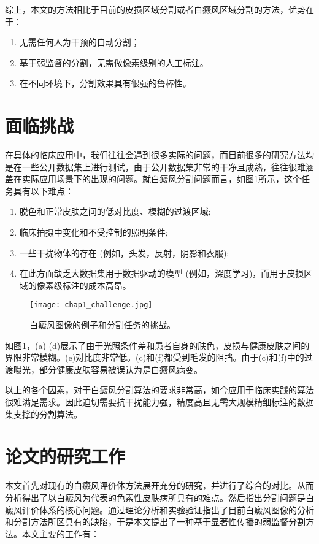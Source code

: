 综上，本文的方法相比于目前的皮损区域分割或者白癜风区域分割的方法，优势在于：
\begin{enumerate}
\item 无需任何人为干预的自动分割；
\item 基于弱监督的分割，无需做像素级别的人工标注。
\item 在不同环境下，分割效果具有很强的鲁棒性。
\end{enumerate}

\section{面临挑战}
在具体的临床应用中，我们往往会遇到很多实际的问题，而目前很多的研究方法均是在一些公开数据集上进行测试，由于公开数据集非常的干净且成熟，往往很难涵盖在实际应用场景下的出现的问题。就白癜风分割问题而言，如图\ref{fig:chap1_challenge}所示，这个任务具有以下难点：
\begin{enumerate}
\item 脱色和正常皮肤之间的低对比度、模糊的过渡区域; 
\item 临床拍摄中变化和不受控制的照明条件;
\item 一些干扰物体的存在 (例如，头发，反射，阴影和衣服); 
\item 在此方面缺乏大数据集用于数据驱动的模型 (例如，深度学习)，而用于皮损区域的像素级标注的成本高昂。
\end{enumerate}
\begin{figure}[htbp]
\begin{center}
\texttt{[image: chap1\_challenge.jpg]}
\end{center}
\caption{白癜风图像的例子和分割任务的挑战。}
\label{fig:chap1_challenge}
\end{figure}
如图\ref{fig:chap1_challenge}，(a)-(d)展示了由于光照条件差和患者自身的肤色，皮损与健康皮肤之间的界限非常模糊。(e)对比度非常低。(c)和(f)都受到毛发的阻挡。由于(c)和(f)中的过渡曝光，部分健康皮肤容易被误认为是白癜风病变。

以上的各个因素，对于白癜风分割算法的要求非常高，如今应用于临床实践的算法很难满足需求。因此迫切需要抗干扰能力强，精度高且无需大规模精细标注的数据集支撑的分割算法。

\section{论文的研究工作}
本文首先对现有的白癜风评价体方法展开充分的研究，并进行了综合的对比。从而分析得出了以白癜风为代表的色素性皮肤病所具有的难点。然后指出分割问题是白癜风评价体系的核心问题。通过理论分析和实验验证指出了目前白癜风图像的分析和分割方法所区具有的缺陷，于是本文提出了一种基于显著性传播的弱监督分割方法。本文主要的工作有：

